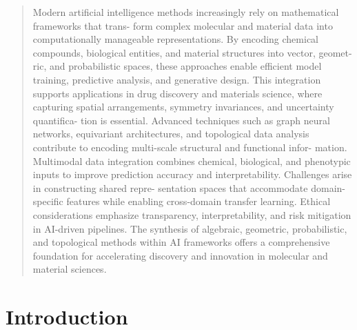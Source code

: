 \documentclass[
]{article}
\begin{document}
\begin{quote}
Modern artificial intelligence methods increasingly rely on mathematical
frameworks that trans- form complex molecular and material data into
computationally manageable representations. By encoding chemical
compounds, biological entities, and material structures into vector,
geomet- ric, and probabilistic spaces, these approaches enable efficient
model training, predictive analysis, and generative design. This
integration supports applications in drug discovery and materials
science, where capturing spatial arrangements, symmetry invariances, and
uncertainty quantifica- tion is essential. Advanced techniques such as
graph neural networks, equivariant architectures, and topological data
analysis contribute to encoding multi-scale structural and functional
infor- mation. Multimodal data integration combines chemical,
biological, and phenotypic inputs to improve prediction accuracy and
interpretability. Challenges arise in constructing shared repre-
sentation spaces that accommodate domain-specific features while
enabling cross-domain transfer learning. Ethical considerations
emphasize transparency, interpretability, and risk mitigation in
AI-driven pipelines. The synthesis of algebraic, geometric,
probabilistic, and topological methods within AI frameworks offers a
comprehensive foundation for accelerating discovery and innovation in
molecular and material sciences.
\end{quote}

\hypertarget{introduction}{%
\section{Introduction}\label{introduction}}
\end{document}
